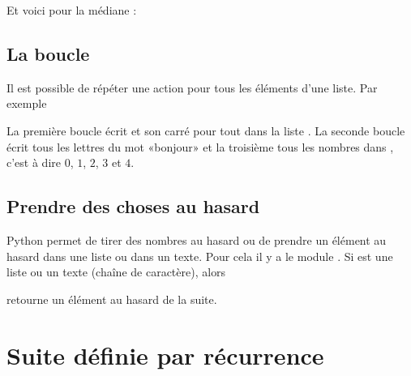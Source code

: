 


Et voici pour la médiane :





\section{La boucle }

Il est possible de répéter une action pour tous les éléments d'une liste. Par exemple



La première boucle écrit  et son carré pour tout  dans la liste \info{[1,5,10,2]}. La seconde boucle écrit tous les lettres du mot «bonjour» et la troisième tous les nombres dans , c'est à dire \( 0\), \( 1\), \( 2\), \( 3\) et \( 4\).




\section{Prendre des choses au hasard}

Python permet de tirer des nombres au hasard ou de prendre un élément au hasard dans une liste ou dans un texte. Pour cela il y a le module . Si  est une liste ou un texte (chaîne de caractère), alors
\begin{quote}
\end{quote}
retourne un élément au hasard de la suite.


\chapter{Suite définie par récurrence}

